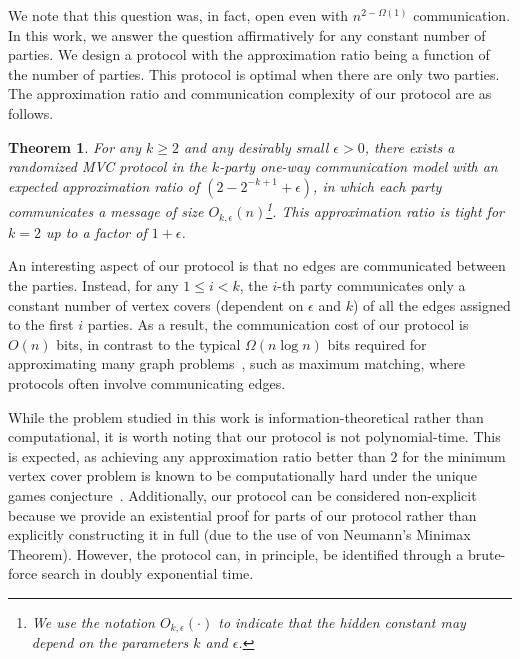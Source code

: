 \documentclass[11pt]{article}
\newtheorem{theorem}{Theorem}[section]
\begin{document}
We note that this question was, in fact, open even with $n^{2-\Omega(1)}$ communication. In this work, we answer the question affirmatively for any constant number of parties. We design a protocol with the approximation ratio being a function of the number of parties. This protocol is optimal when there are only two parties. The approximation ratio and communication complexity of our protocol are as follows. 

\newcommand{\maintheorem}[0]{For any $k \geq 2$ and any desirably small $\epsilon > 0$, there exists a randomized MVC protocol in the $k$-party one-way communication model with an expected approximation ratio of $(2 - 2^{-k+1} + \epsilon)$, in which each party communicates a message of size \(O_{k, \epsilon}(n)\)\footnote{We use the notation \(O_{k, \epsilon}(\cdot)\) to indicate that the hidden constant may depend on the parameters $k$ and $\epsilon$.}. This approximation ratio is tight for $k=2$ up to a factor of $1+\epsilon$.}

\begin{theorem} \label{thm:upper-mvc}
\maintheorem{}
\end{theorem}


An interesting aspect of our protocol is that no edges are communicated between the parties. Instead, for any \(1 \leq i < k\), the \(i\)-th party communicates only a constant number of vertex covers (dependent on \(\epsilon\) and \(k\)) of all the edges assigned to the first \(i\) parties. As a result, the communication cost of our protocol is \(O(n)\) bits, in contrast to the typical \(\Omega(n\log n)\) bits required for approximating many graph problems~\cite{DBLP:conf/approx/SunW15}, such as maximum matching, where protocols often involve communicating edges.


While the problem studied in this work is  information-theoretical rather than computational, it is worth noting that our protocol is not polynomial-time. This is expected, as achieving any approximation ratio better than $2$ for the minimum vertex cover problem is known to be computationally hard under the unique games conjecture~\cite{DBLP:journals/jcss/KhotR08}. Additionally, our protocol can be considered non-explicit because we provide an existential proof for parts of our protocol rather than explicitly constructing it in full (due to the use of von Neumann's Minimax Theorem). However, the protocol can, in principle, be identified through a brute-force search in doubly exponential time.
\end{document}
